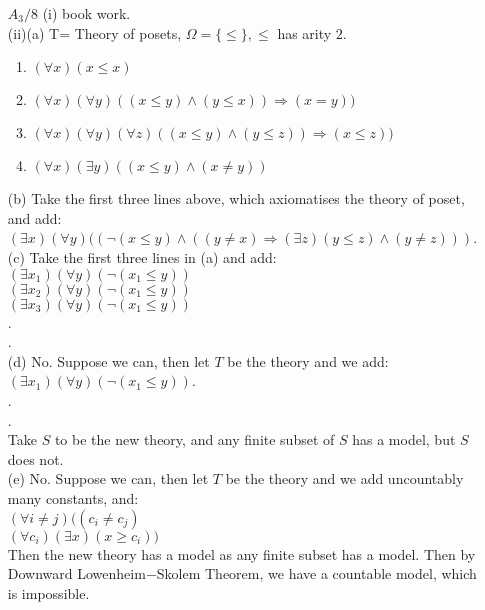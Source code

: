 \begin{enumerate}
\item[$A_3/8$] (i) book work.\\
      (ii)(a) T= Theory of posets, $\Omega=\{\le\}, \le$ has arity $2$.\\
      \begin{enumerate}
      \item $(\forall x)(x \le x)$\\
      \item $(\forall x)(\forall y)((x \le y) \wedge (y \le x)) \Rightarrow (x=y))$\\
      \item $(\forall x)(\forall y)(\forall z)((x \le y) \wedge (y \le z)) \Rightarrow (x \le z))$\\
      \item $(\forall x)(\exists y)((x \le y) \wedge (x \neq y))$\\
      \end{enumerate}
      (b) Take the first three lines above, which axiomatises the theory of poset, and add:\\
      $(\exists x)(\forall y)((\neg (x \le y) \wedge ((y \neq x) \Rightarrow (\exists z)(y \le z) \wedge (y \neq z)))$.\\
      (c) Take the first three lines in (a) and add:\\
      $(\exists x_1)(\forall y)(\neg (x_1 \le y))$\\
      $(\exists x_2)(\forall y)(\neg (x_1 \le y))$\\
      $(\exists x_3)(\forall y)(\neg (x_1 \le y))$\\
      .\\
      .\\
      (d) No. Suppose we can, then let $T$ be the theory and we add:\\
      $(\exists x_1)(\forall y)(\neg (x_1 \le y))$.\\
      .\\
      .\\
      Take $S$ to be the new theory, and any finite subset of $S$ has a model, but $S$ does not.\\
      (e) No. Suppose we can, then let $T$ be the theory and we add uncountably many constants, and:\\
      $(\forall i \neq j)((c_i \neq c_j)$\\
      $(\forall c_i)(\exists x)(x \ge c_i))$\\
      Then the new theory has a model as any finite subset has a model. Then by Downward Lowenheim$-$Skolem Theorem, we have a countable model, which is impossible.
\end{enumerate}
